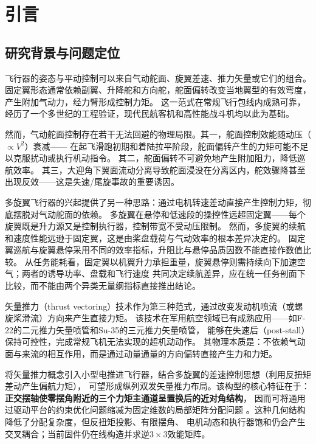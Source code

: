 \section{引言}
\label{sec:intro}

\subsection{研究背景与问题定位}

飞行器的姿态与平动控制可以来自气动舵面、旋翼差速、推力矢量或它们的组合。
固定翼形态通常依赖副翼、升降舵和方向舵，舵面偏转改变当地翼型的有效弯度，产生附加气动力，经力臂形成控制力矩。
这一范式在常规飞行包线内成熟可靠，经历了一个多世纪的工程验证，现代民航客机和高性能战斗机均以此为基础\cite{stevens2015aircraft}。

然而，气动舵面控制存在若干无法回避的物理局限。其一，舵面控制效能随动压（$\propto V^2$）衰减——
在起飞滑跑初期和着陆拉平阶段，舵面偏转产生的力矩可能不足以克服扰动或执行机动指令。
其二，舵面偏转不可避免地产生附加阻力，降低巡航效率。
其三，大迎角下翼面流动分离导致舵面浸没在分离区内，舵效骤降甚至出现反效——这是失速/尾旋事故的重要诱因。

多旋翼飞行器的兴起提供了另一种思路：通过电机转速差动直接产生控制力矩，彻底摆脱对气动舵面的依赖\cite{mahony2012multirotor}。
多旋翼在悬停和低速段的操控性远超固定翼——每个旋翼既是升力源又是控制执行器，控制带宽不受动压限制。
然而，多旋翼的续航和速度性能远逊于固定翼，这是由桨盘载荷与气动效率的根本差异决定的。
固定翼巡航与旋翼悬停采用不同的效率指标，升阻比与悬停品质因数不能直接作数值比较。
从任务能耗看，固定翼以机翼升力承担重量，旋翼悬停则需持续向下加速空气；两者的诱导功率、盘载和飞行速度
共同决定续航差异，应在统一任务剖面下比较，而不能由两个异类无量纲指标直接推出结论。

矢量推力（thrust vectoring）技术作为第三种范式，通过改变发动机喷流（或螺旋桨滑流）方向来产生直接力矩。
该技术在军用航空领域已有成熟应用——如F-22的二元推力矢量喷管和Su-35的三元推力矢量喷管，
能够在失速后（post-stall）保持可控性，完成常规飞机无法实现的超机动动作\cite{stevens2015aircraft}。
其物理本质是：不依赖气动面与来流的相互作用，而是通过动量通量的方向偏转直接产生力和力矩。

将矢量推力概念引入小型电推进飞行器，结合多旋翼的差速控制思想（利用反扭矩差动产生偏航力矩），
可望形成纵列双发矢量推力布局。该构型的核心特征在于：
\textbf{正交摆轴使零摆角附近的三个力矩主通道呈置换后的近对角结构}，
因而可将通用过驱动平台的约束优化问题缩减为固定维数的局部矩阵分配问题
\cite{johansen2013control}。这种几何结构降低了分配复杂度，但反扭矩投影、有限摆角、
电机动态和执行器饱和仍会产生交叉耦合；当前固件仍在线构造并求逆$3\times3$效能矩阵。

